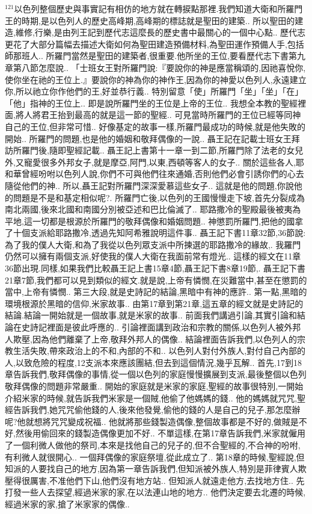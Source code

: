 \documentclass{book}
\begin{document}
$^{121}$以色列整個歷史與事實記有相仿的地方就在轉捩點那裡.我們知道大衛和所羅門王的時期,是以色列人的歷史高峰期,高峰期的標誌就是聖田的建築..
所以聖田的建造,維修,行樂,是由列王記到歷代志這麼長的歷史書中最關心的一個中心點..
歷代志更花了大部分篇幅去描述大衛如何為聖田建造預備材料,為聖田運作預備人手,包括師那班人..
所羅門當然是聖田的建築者,很重要.他所坐的王位,要看歷代志下書第九章第八節怎麼說..
「士班女王對所羅門說:『要說你的神是應當稱頌的,因祂喜悅你,使你坐在祂的王位上.』要說你的神為你的神作王,因為你的神愛以色列人,永遠建立你,所以祂立你作他們的王,好並恭行義..
特別留意「使」所羅門「坐」「坐」「在」「他」指神的王位上..
即是說所羅門坐的王位是上帝的王位..
我想全本教的聖經裡面,將人將君王抬到最高的就是這一節的聖經..
可見當時所羅門的王位已經等同神自己的王位,但非常可惜..
好像基定的故事一樣,所羅門最成功的時候,就是他失敗的開始..
所羅門的問題,也是他的婚姻和敬拜偶像的一說..
聶王記在記載士班女王拜訪所羅門後,隨即聖經記載..
聶王記上書第十一章一到二節,所羅門除了法老的女兒外,又寵愛很多外邦女子,就是摩亞,阿門,以東,西頓等客人的女子..
關於這些各人,耶和華曾經吩咐以色列人說,你們不可與他們往來通婚,否則他們必會引誘你們的心去隨從他們的神..
所以,聶王記對所羅門深深愛慕這些女子..
這就是他的問題,你說他的問題是不是和基定相似呢?.
所羅門亡後,以色列的王國慢慢走下坡,首先分裂成為南北兩國,後來北國和南國分別被亞述和巴比倫滅了..
耶路撒冷的聖殿最後被夷為平地,這一切都是根源於所羅門的敬拜偶像和婚姻問題..
神懲罰所羅門,把他的國拿了十個支派給耶路撒冷,透過先知阿希雅說明這件事..
聶王記下書11章32節,36節說:為了我的僕人大衛,和為了我從以色列眾支派中所揀選的耶路撒冷的緣故,.
我羅門仍然可以擁有兩個支派,好使我的僕人大衛在我面前常有燈光..
這樣的經文在11章36節出現.同樣,如果我們比較聶王記上書15章4節,聶王記下書8章19節,.
聶王記下書21章7節,我們都可以見到類似的經文.就是說,上帝有憐憫,在災難當中,甚至在懲罰的當中,上帝有憐憫..
第三大段,就是史詩記的結論,黑暗中有神的應許..
第一點,黑暗的環境根源於黑暗的信仰,米家故事..
由第17章到第21章,這五章的經文就是史詩記的結論.結論一開始就是一個故事,就是米家的故事..
前面我們講過引論,其實引論和結論在史詩記裡面是彼此呼應的..
引論裡面講到政治和宗教的關係,以色列人被外邦人欺壓,因為他們離棄了上帝,敬拜外邦人的偶像..
結論裡面告訴我們,以色列人的宗教生活失敗,帶來政治上的不和,內部的不和..
以色列人對付外族人,對付自己內部的人,以致危險的程度,12支派本來應該團結,但去到這個情況,幾乎瓦解..
首先,17到18章告訴我們,敬拜偶像的事情,從一個以色列的家庭慢慢擴展到支派,最後整個以色列敬拜偶像的問題非常嚴重..
開始的家庭就是米家的家庭,聖經的故事很特別,一開始介紹米家的時候,就告訴我們米家是一個賊,他偷了他媽媽的錢..
他的媽媽就咒咒,聖經告訴我們,她咒咒偷他錢的人,後來他發覺,偷他的錢的人是自己的兒子,那怎麼辦呢?他就想將咒咒變成祝福..
他就將那些錢製造偶像,整個故事都是不好的,做賊是不好,然後用偷回來的錢製造偶像更加不好..
不單這樣,在第17章告訴我們,米家就僱用了一個利微人做他的祭司,本來是找他自己的兒子的,但不合聖經的,不合神的吩咐,有利微人就很開心..
一個拜偶像的家庭祭壇,從此成立了..
第18章的時候,聖經說,但知派的人要找自己的地方,因為第一章告訴我們,但知派被外族人,特別是菲律賓人欺壓得很厲害,不准他們下山,他們沒有地方站..
但知派人就遠走他方,去找地方住..
先打發一些人去探望,經過米家的家,在以法連山地的地方..
他們決定要去北遷的時候,經過米家的家,搶了米家家的偶像..
\end{document}
